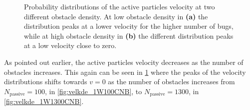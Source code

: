 \begin{figure}[htbp!]
\centering
\caption{Probability distributions of the active particles velocity at two different obstacle density. 
	At low obstacle density in \textbf{(a)} the distribution peaks at a lower velocity for the higher 
	number of bugs, while at high obstacle density in \textbf{(b)} the different distribution peaks at 
	a low velocity close to zero.
} 
\label{fig:velkde_1WNCNB}
\end{figure}



As pointed out earlier, the active particles velocity decreases as the number of obstacles increases. This 
again can be seen in \cref{fig:velkde_1WNCNB} where the peaks of the velocity distributions shifts towards $v=0$ 
as the number of obstacles increases from $N_{\text{passive}}=100$, in \cref{fig:velkde_1W100CNB}, to 
$N_{\text{passive}}=1300$, in \cref{fig:velkde_1W1300CNB}.

